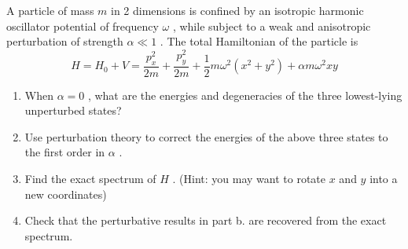 \begin{exercise}
\label{physics:2023:2}
A particle of mass $m$ in 2 dimensions is confined by an isotropic harmonic oscillator potential of frequency $\omega$ , while subject to a weak and anisotropic perturbation of strength $\alpha \ll 1$ . The total Hamiltonian of the particle is
\begin{equation}
    H = H _ {0} + V = \frac {p _ {x} ^ {2}}{2 m} + \frac {p _ {y} ^ {2}}{2 m} + \frac {1}{2} m \omega^ {2} \left(x ^ {2} + y ^ {2}\right) + \alpha m \omega^ {2} x y \label{eq:2023:2:3}
\end{equation}

\begin{enumerate}[label=(\alph*)]
    \item When $\alpha = 0$ , what are the energies and degeneracies of the three lowest-lying unperturbed states?
    \item Use perturbation theory to correct the energies of the above three states to the first order in $\alpha$ .
    \item Find the exact spectrum of $H$ . (Hint: you may want to rotate $x$ and $y$ into a new coordinates)
    \item Check that the perturbative results in part b. are recovered from the exact spectrum.
\end{enumerate}
\end{exercise}

